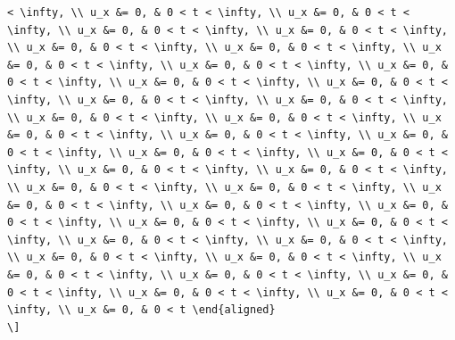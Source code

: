 \documentclass[
  ukrainian,
]{article}
\begin{document}
\begin{verbatim}
< \infty, \\ u_x &= 0, & 0 < t < \infty, \\ u_x &= 0, & 0 < t < \infty, \\ u_x &= 0, & 0 < t < \infty, \\ u_x &= 0, & 0 < t < \infty, \\ u_x &= 0, & 0 < t < \infty, \\ u_x &= 0, & 0 < t < \infty, \\ u_x &= 0, & 0 < t < \infty, \\ u_x &= 0, & 0 < t < \infty, \\ u_x &= 0, & 0 < t < \infty, \\ u_x &= 0, & 0 < t < \infty, \\ u_x &= 0, & 0 < t < \infty, \\ u_x &= 0, & 0 < t < \infty, \\ u_x &= 0, & 0 < t < \infty, \\ u_x &= 0, & 0 < t < \infty, \\ u_x &= 0, & 0 < t < \infty, \\ u_x &= 0, & 0 < t < \infty, \\ u_x &= 0, & 0 < t < \infty, \\ u_x &= 0, & 0 < t < \infty, \\ u_x &= 0, & 0 < t < \infty, \\ u_x &= 0, & 0 < t < \infty, \\ u_x &= 0, & 0 < t < \infty, \\ u_x &= 0, & 0 < t < \infty, \\ u_x &= 0, & 0 < t < \infty, \\ u_x &= 0, & 0 < t < \infty, \\ u_x &= 0, & 0 < t < \infty, \\ u_x &= 0, & 0 < t < \infty, \\ u_x &= 0, & 0 < t < \infty, \\ u_x &= 0, & 0 < t < \infty, \\ u_x &= 0, & 0 < t < \infty, \\ u_x &= 0, & 0 < t < \infty, \\ u_x &= 0, & 0 < t < \infty, \\ u_x &= 0, & 0 < t < \infty, \\ u_x &= 0, & 0 < t < \infty, \\ u_x &= 0, & 0 < t < \infty, \\ u_x &= 0, & 0 < t < \infty, \\ u_x &= 0, & 0 < t < \infty, \\ u_x &= 0, & 0 < t < \infty, \\ u_x &= 0, & 0 < t < \infty, \\ u_x &= 0, & 0 < t \end{aligned}
\]
\end{verbatim}
\end{document}
